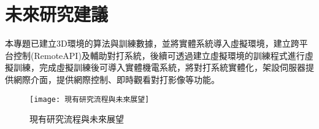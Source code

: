 \chapter{未來研究建議}
本專題已建立3D環境的算法與訓練數據，並將實體系統導入虛擬環境，建立跨平台控制(RemoteAPI)及輔助對打系統，後續可透過建立虛擬環境的訓練程式進行虛擬訓練，完成虛擬訓練後可導入實體機電系統，將對打系統實體化，架設伺服器提供網際介面，提供網際控制、即時觀看對打影像等功能。
\begin{figure}[hbt!]
\begin{center}
\texttt{[image: 現有研究流程與未來展望]}
\caption{\Large 現有研究流程與未來展望}
\label{fig.現有研究流程與未來展望}
\end{center}
\end{figure}
